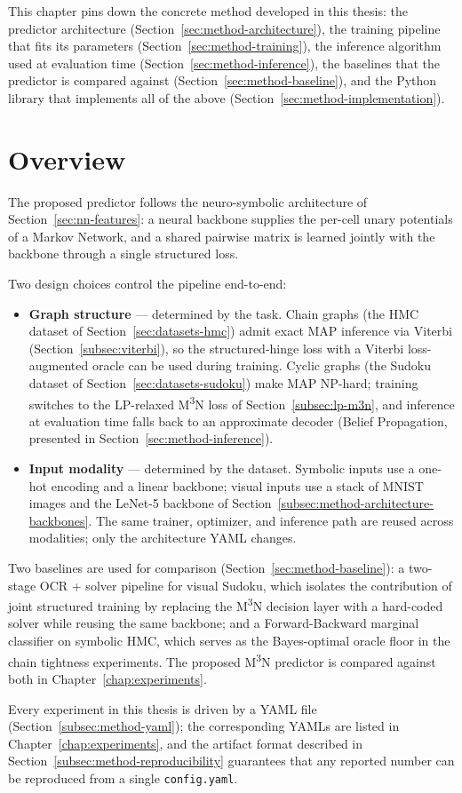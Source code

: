 This chapter pins down the concrete method developed in this
thesis: the predictor architecture
(Section~\ref{sec:method-architecture}), the training pipeline
that fits its parameters (Section~\ref{sec:method-training}),
the inference algorithm used at evaluation time
(Section~\ref{sec:method-inference}), the baselines
that the predictor is compared against
(Section~\ref{sec:method-baseline}), and the Python library
that implements all of the above
(Section~\ref{sec:method-implementation}).

\section{Overview}
\label{sec:method-overview}

The proposed predictor follows the neuro-symbolic architecture
of Section~\ref{sec:nn-features}: a neural backbone supplies
the per-cell unary potentials of a Markov Network, and a
shared pairwise matrix is learned jointly with the backbone
through a single structured loss.

Two design choices control the pipeline end-to-end:
\begin{itemize}
    \item \textbf{Graph structure} --- determined by the
    task. Chain graphs (the HMC dataset of
    Section~\ref{sec:datasets-hmc}) admit exact MAP inference
    via Viterbi (Section~\ref{subsec:viterbi}), so the
    structured-hinge loss with a Viterbi loss-augmented oracle
    can be used during training. Cyclic graphs (the Sudoku
    dataset of Section~\ref{sec:datasets-sudoku}) make MAP
    NP-hard; training switches to the LP-relaxed
    M\textsuperscript{3}N loss of
    Section~\ref{subsec:lp-m3n}, and inference at evaluation
    time falls back to an approximate decoder (Belief
    Propagation, presented in
    Section~\ref{sec:method-inference}).
    \item \textbf{Input modality} --- determined by the
    dataset. Symbolic inputs use a one-hot encoding and a
    linear backbone; visual inputs use a stack of MNIST
    images and the LeNet-5 backbone of
    Section~\ref{subsec:method-architecture-backbones}. The
    same trainer, optimizer, and inference path are reused
    across modalities; only the architecture YAML changes.
\end{itemize}

Two baselines are used for comparison
(Section~\ref{sec:method-baseline}): a two-stage OCR + solver
pipeline for visual Sudoku, which isolates the contribution of
joint structured training by replacing the M\textsuperscript{3}N
decision layer with a hard-coded solver while reusing the same
backbone; and a Forward-Backward marginal classifier on symbolic
HMC, which serves as the Bayes-optimal oracle floor in the chain
tightness experiments. The proposed M\textsuperscript{3}N
predictor is compared against both in
Chapter~\ref{chap:experiments}.

Every experiment in this thesis is driven by a YAML file
(Section~\ref{subsec:method-yaml}); the corresponding YAMLs
are listed in Chapter~\ref{chap:experiments}, and the
artifact format described in
Section~\ref{subsec:method-reproducibility} guarantees that
any reported number can be reproduced from a single
\texttt{config.yaml}.